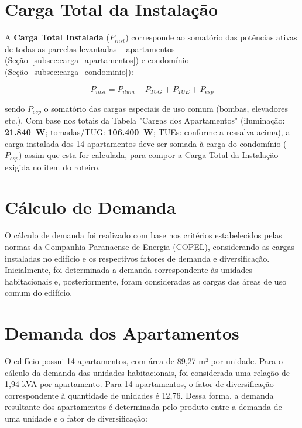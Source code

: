 \documentclass[12pt,openright,oneside,a4paper,brazil]{abntex2}
\begin{document}
\section{Carga Total da Instalação}
\label{subsec:carga_total}
\hspace{1.27cm}
A \textbf{Carga Total Instalada} ($P_{inst}$) corresponde ao somatório das
potências ativas de todas as parcelas levantadas -- apartamentos
(Seção~\ref{subsec:carga_apartamentos}) e condomínio
(Seção~\ref{subsec:carga_condominio}):

\begin{equation}
    P_{inst} = P_{ilum} + P_{TUG} + P_{TUE} + P_{esp}
    \label{eq:carga_instalada}
\end{equation}

sendo $P_{esp}$ o somatório das cargas especiais de uso comum (bombas,
elevadores etc.). Com base nos totais da Tabela "Cargas dos Apartamentos"
(iluminação: \textbf{21.840~W}; tomadas/TUG: \textbf{106.400~W}; TUEs:
conforme a ressalva acima), a carga instalada dos 14 apartamentos deve ser
somada à carga do condomínio ($P_{esp}$) assim que esta for calculada, para
compor a Carga Total da Instalação exigida no item do roteiro.




\section{Cálculo de Demanda}

\hspace{1.27cm}O cálculo de demanda foi realizado com base nos critérios estabelecidos pelas normas da Companhia Paranaense de Energia (COPEL), considerando as cargas instaladas no edifício e os respectivos fatores de demanda e diversificação. Inicialmente, foi determinada a demanda correspondente às unidades habitacionais e, posteriormente, foram consideradas as cargas das áreas de uso comum do edifício.

\section{Demanda dos Apartamentos}
\hspace{1.27cm}O edifício possui 14 apartamentos, com área de 89,27 m² por unidade. Para o cálculo da demanda das unidades habitacionais, foi considerada uma relação de 1,94 kVA por apartamento. Para 14 apartamentos, o fator de diversificação correspondente à quantidade de unidades é 12,76. Dessa forma, a demanda resultante dos apartamentos é determinada pelo produto entre a demanda de uma unidade e o fator de diversificação:
\end{document}
